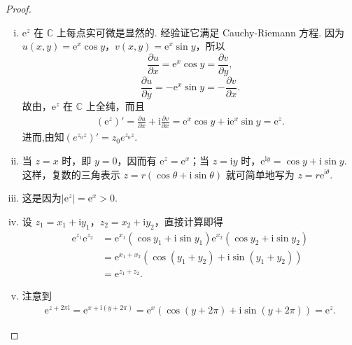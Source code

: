 \documentclass[../../main.tex]{subfiles}%
\begin{document}
\begin{proof}
\begin{enumerate}[(i)]
\item \( \mathrm{e}^z \) 在 \( \mathbb{C} \) 上每点实可微是显然的. 经验证它满足 Cauchy-Riemann 方程. 因为 \( u(x, y) = \mathrm{e}^x \cos y \)，\( v(x, y) = \mathrm{e}^x \sin y \)，所以
\[
\frac{\partial u}{\partial x} = \mathrm{e}^x \cos y = \frac{\partial v}{\partial y},
\]
\[
\frac{\partial u}{\partial y} = -\mathrm{e}^x \sin y = -\frac{\partial v}{\partial x}.
\]
故由，\( \mathrm{e}^z \) 在 \( \mathbb{C} \) 上全纯，而且
\begin{align*}
(\mathrm{e}^z)' = \frac{\partial u}{\partial x} + \mathrm{i} \frac{\partial v}{\partial x}= \mathrm{e}^x \cos y + \mathrm{i} \mathrm{e}^x \sin y= \mathrm{e}^z.
\end{align*}
进而,由知$\left( e^{z_0z} \right) ' =z_0e^{z_0z}.$

\item 当 \( z = x \) 时，即 \( y = 0 \)，因而有 \( \mathrm{e}^z = \mathrm{e}^x \)；当 \( z = \mathrm{i}y \) 时，\( \mathrm{e}^{\mathrm{i}y} = \cos y + \mathrm{i}\sin y \). 这样，复数的三角表示 \( z = r(\cos\theta + \mathrm{i}\sin\theta) \) 就可简单地写为 \( z = r\mathrm{e}^{\mathrm{i}\theta} \).

\item 这是因为$|\mathrm{e}^z| = \mathrm{e}^x > 0.$

\item 设 \( z_1 = x_1 + \mathrm{i}y_1 \)，\( z_2 = x_2 + \mathrm{i}y_2 \)，直接计算即得
\begin{align*}
\mathrm{e}^{z_1} \mathrm{e}^{z_2} &= \mathrm{e}^{x_1} (\cos y_1 + \mathrm{i}\sin y_1) \mathrm{e}^{x_2} (\cos y_2 + \mathrm{i}\sin y_2)\\
&= \mathrm{e}^{x_1 + x_2} (\cos(y_1 + y_2) + \mathrm{i}\sin(y_1 + y_2))\\
&= \mathrm{e}^{z_1 + z_2}.
\end{align*}

\item 注意到
\begin{align*}
\mathrm{e}^{z + 2\pi\mathrm{i}} = \mathrm{e}^{x + \mathrm{i}(y + 2\pi)}= \mathrm{e}^x (\cos(y + 2\pi) + \mathrm{i}\sin(y + 2\pi))= \mathrm{e}^z.
\end{align*}
\end{enumerate}
\end{proof}
\end{document}
